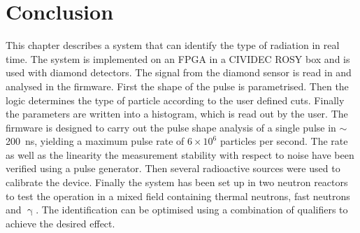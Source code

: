 \clearpage
\section{Conclusion}
\label{sec:conclcurrent}
This chapter describes a system that can identify the type of radiation in real time. The system is implemented on an FPGA in a CIVIDEC ROSY box and is used with diamond detectors. The signal from the diamond sensor is read in and analysed in the firmware. First the shape of the pulse is parametrised. Then the logic determines the type of particle according to the user defined cuts. Finally the parameters are written into a histogram, which is read out by the user. The firmware is designed to carry out the pulse shape analysis of a single pulse in $\sim$200~ns, yielding a maximum pulse rate of $6\times10^6$ particles per second. The rate as well as the linearity the measurement stability with respect to noise have been verified using a pulse generator. Then several radioactive sources were used to calibrate the device. Finally the system has been set up in two neutron reactors to test the operation in a mixed field containing thermal neutrons, fast neutrons and $\upgamma$. The identification can be optimised using a combination of qualifiers to achieve the desired effect.


